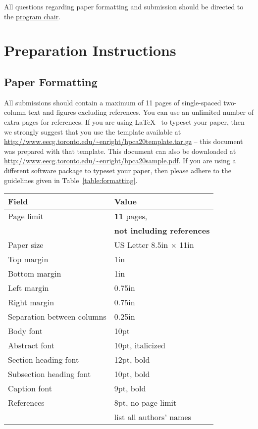 \documentclass[pageno]{jpaper}
\begin{document}
{All questions regarding paper formatting and submission should be directed to
the \href{mailto:enright@eecg.toronto.edu}{program chair}.

\section{Preparation Instructions}

\subsection{Paper Formatting}

All submissions should contain a maximum of 11 pages of single-spaced
two-column text and figures excluding references. You can use an unlimited number of extra pages for references. 
If you are using \LaTeX~\cite{lamport94} 
to typeset your paper, then we 
strongly suggest
that you use the template available at
\url{http://www.eecg.toronto.edu/~enright/hpca20template.tar.gz} -- this
document was prepared with that template.  This document can
also be downloaded at \url{http://www.eecg.toronto.edu/~enright/hpca20sample.pdf}.
If you are using a different
software package to typeset your paper, then please adhere to the guidelines
given in Table~\ref{table:formatting}.

\begin{table*}[t]
  \centering
  \begin{tabular}{|l|l|}
    \hline
    \textbf{Field} & \textbf{Value}\\
    \hline
    \hline
    Page limit & {\bf 11} pages, \\
& {\bf not including references}\\
    \hline
    Paper size & US Letter 8.5in $\times$ 11in\\
    \hline
    Top margin & 1in\\
    \hline
    Bottom margin & 1in\\
    \hline
    Left margin & 0.75in\\
    \hline
    Right margin & 0.75in\\
    \hline
    Separation between columns & 0.25in\\
    \hline
    Body font & 10pt\\
    \hline
    Abstract font & 10pt, italicized\\
    \hline
    Section heading font & 12pt, bold\\
    \hline
    Subsection heading font & 10pt, bold\\
    \hline
    Caption font & 9pt, bold\\
    \hline
    References & 8pt, no page limit\\
& list all authors' names \\
    \hline
  \end{tabular}
  \caption{Formatting guidelines for submission.}
  \label{table:formatting}
\end{table*}

}
\end{document}
